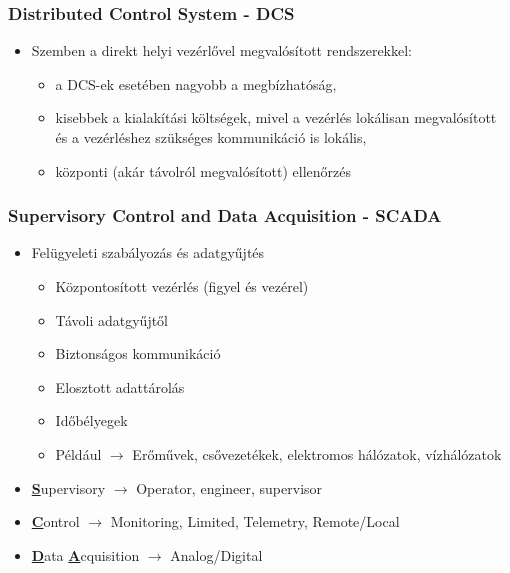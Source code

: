 \subsubsection{Distributed Control System - DCS}
\begin{itemize}
    \item Szemben a direkt helyi vezérlővel megvalósított rendszerekkel:
    \begin{itemize}
        \item a DCS-ek esetében nagyobb a megbízhatóság,
        \item kisebbek a kialakítási költségek, mivel a vezérlés lokálisan megvalósított és a vezérléshez szükséges kommunikáció is lokális,
        \item központi (akár távolról megvalósított) ellenőrzés
    \end{itemize}
\end{itemize}

\subsubsection{Supervisory Control and Data Acquisition - SCADA}
\begin{itemize}
    \item Felügyeleti szabályozás és adatgyűjtés
    \begin{itemize}
        \item Központosított vezérlés (figyel és vezérel)
        \item Távoli adatgyűjtől
        \item Biztonságos kommunikáció
        \item Elosztott adattárolás
        \item Időbélyegek
        \item Például $\rightarrow$ Erőművek, csővezetékek, elektromos hálózatok, vízhálózatok
    \end{itemize}
    \item \underline{\textbf{S}}upervisory $\rightarrow$ Operator, engineer, supervisor
    \item \underline{\textbf{C}}ontrol $\rightarrow$ Monitoring, Limited, Telemetry, Remote/Local
    \item \underline{\textbf{D}}ata \underline{\textbf{A}}cquisition $\rightarrow$ Analog/Digital
\end{itemize}


